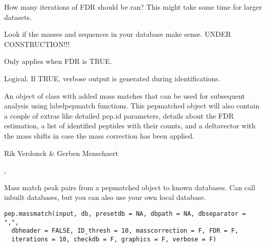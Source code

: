 \documentclass[letterpaper]{book}
\begin{document}
\begin{Arguments}
\begin{ldescription}
\item[\code{iterations}] How many iterations of FDR should be ran? This might take some time for larger datasets.

\item[\code{checkdb}] Look if the masses and sequences in your database make sense. UNDER CONSTRUCTION!!!

\item[\code{graphics}] Only applies when FDR is TRUE.

\item[\code{verbose}] Logical. If TRUE, verbose output is generated during identifications.
\end{ldescription}
\end{Arguments}
%
\begin{Value}
An object of class  with added mass matches that can be used for subsequent analysis using labelpepmatch functions. This pepmatched object will also contain a couple of extras like detailed pep.id parameters, details about the FDR estimation, a list of identified peptides with their counts, and a deltavector with the mass shifts in case the mass correction has been applied.
\end{Value}
%
\begin{Author}\relax
Rik Verdonck \& Gerben Menschaert
\end{Author}
%
\begin{SeeAlso}\relax
{}, 
\end{SeeAlso}
%
\begin{Description}\relax
Mass match peak pairs from a pepmatched object to known databases. Can call inbuilt databases, but you can also use your own local database.
\end{Description}
%
\begin{Usage}
\begin{verbatim}
pep.massmatch(input, db, presetdb = NA, dbpath = NA, dbseparator = ",",
  dbheader = FALSE, ID_thresh = 10, masscorrection = F, FDR = F,
  iterations = 10, checkdb = F, graphics = F, verbose = F)
\end{verbatim}
\end{Usage}
%
\end{document}
